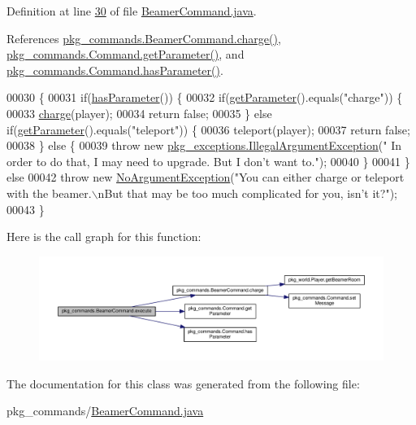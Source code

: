 Definition at line \hyperlink{BeamerCommand_8java_source_l00030}{30} of file \hyperlink{BeamerCommand_8java_source}{Beamer\-Command.\-java}.



References \hyperlink{BeamerCommand_8java_source_l00067}{pkg\-\_\-commands.\-Beamer\-Command.\-charge()}, \hyperlink{Command_8java_source_l00041}{pkg\-\_\-commands.\-Command.\-get\-Parameter()}, and \hyperlink{Command_8java_source_l00073}{pkg\-\_\-commands.\-Command.\-has\-Parameter()}.


\begin{DoxyCode}
00030                                                                                                            
                              \{
00031         \textcolor{keywordflow}{if}(\hyperlink{classpkg__commands_1_1Command_a02af95ab3f1898a66259ab7c177b6998}{hasParameter}()) \{
00032             \textcolor{keywordflow}{if}(\hyperlink{classpkg__commands_1_1Command_a41c92d445be73ea9d62320c65efb8434}{getParameter}().equals(\textcolor{stringliteral}{"charge"})) \{
00033                 \hyperlink{classpkg__commands_1_1BeamerCommand_ae71665296a18d581ad1f714c1078e37b}{charge}(player);
00034                 \textcolor{keywordflow}{return} \textcolor{keyword}{false};
00035             \} \textcolor{keywordflow}{else} \textcolor{keywordflow}{if}(\hyperlink{classpkg__commands_1_1Command_a41c92d445be73ea9d62320c65efb8434}{getParameter}().equals(\textcolor{stringliteral}{"teleport"})) \{
00036                 teleport(player);
00037                 \textcolor{keywordflow}{return} \textcolor{keyword}{false};
00038             \} \textcolor{keywordflow}{else} \{
00039                 \textcolor{keywordflow}{throw} \textcolor{keyword}{new} \hyperlink{classpkg__exceptions_1_1IllegalArgumentException}{pkg\_exceptions.IllegalArgumentException}(\textcolor{stringliteral}{"
      In order to do that, I may need to upgrade. But I don't want to."});
00040             \}
00041         \} \textcolor{keywordflow}{else} 
00042             \textcolor{keywordflow}{throw} \textcolor{keyword}{new} \hyperlink{classpkg__exceptions_1_1NoArgumentException}{NoArgumentException}(\textcolor{stringliteral}{"You can either charge or teleport with the
       beamer.\(\backslash\)nBut that may be too much complicated for you, isn't it?"});
00043     \}
\end{DoxyCode}


Here is the call graph for this function\-:
\nopagebreak
\begin{figure}[H]
\begin{center}
\leavevmode
\includegraphics[width=350pt]{classpkg__commands_1_1BeamerCommand_a139dc852e180cabd8af15cfed37dcf0e_cgraph}
\end{center}
\end{figure}




The documentation for this class was generated from the following file\-:\begin{DoxyCompactItemize}
\item 
pkg\-\_\-commands/\hyperlink{BeamerCommand_8java}{Beamer\-Command.\-java}\end{DoxyCompactItemize}
